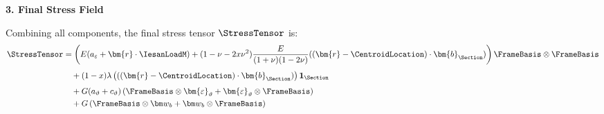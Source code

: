 \textbf{3. Final Stress Field}

Combining all components, the final stress tensor $\StressTensor$ is:
$$
\begin{aligned}
\StressTensor &=
\left( E (a_\varepsilon + \bm{r}\cdot\IesanLoadM) + (1-\nu-2x\nu^2)\frac{E}{(1+\nu)(1-2\nu)} ((\bm{r}-\CentroidLocation)\cdot\bm{b}_{\Section}) \right) \FrameBasis \otimes \FrameBasis \\[4pt]
&\quad + (1-x)\lambda \left( ((\bm{r}-\CentroidLocation)\cdot\bm{b}_{\Section}) \right) \mathbf{1}_\Section \\[4pt]
&\quad + G(a_\vartheta+c_\vartheta)\left(\FrameBasis\otimes\bm{\varepsilon}_{\vartheta}+\bm{\varepsilon}_{\vartheta}\otimes\FrameBasis\right) \\
&\quad + G\left(\FrameBasis\otimes\bm w_b+\bm w_b\otimes\FrameBasis\right)
\end{aligned}
$$

